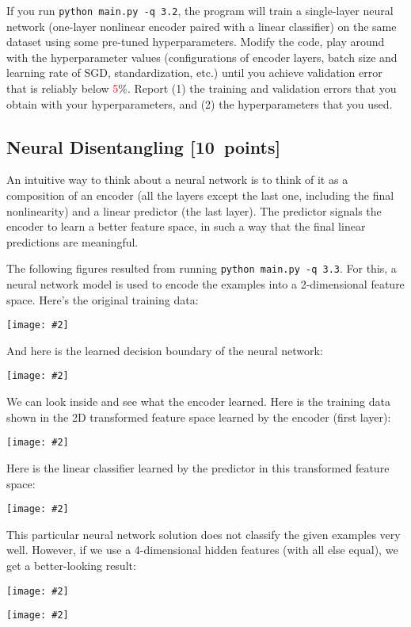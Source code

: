 \documentclass{article}
\newcommand{\blu}[1]{{\textcolor{blu}{#1}}}
\newcommand{\red}[1]{\textcolor{red}{#1}}
\let\ask\blu
\newcommand\pts[1]{\textcolor{pointscolour}{[#1~points]}}
\newcommand{\centerfig}[2]{\begin{center}\texttt{[image: \#2]}\end{center}}
\begin{document}
If you run \texttt{python main.py -q 3.2}, the program will train a single-layer neural network (one-layer nonlinear encoder paired with a linear classifier) on the same dataset using some pre-tuned hyperparameters. Modify the code, play around with the hyperparameter values (configurations of encoder layers, batch size and learning rate of SGD, standardization, etc.) until you achieve validation error that is reliably below \red{5}\%. \ask{Report (1) the training and validation errors that you obtain with your hyperparameters, and (2) the hyperparameters that you used.}




\subsection{Neural Disentangling \pts{10}}

An intuitive way to think about a neural network is to think of it as a composition of an encoder (all the layers except the last one, including the final nonlinearity) and a linear predictor (the last layer). The predictor signals the encoder to learn a better feature space, in such a way that the final linear predictions are meaningful.

The following figures resulted from running \texttt{python main.py -q 3.3}. For this, a neural network model is used to encode the examples into a 2-dimensional feature space. Here's the original training data:

\centerfig{.7}{./figs/sinusoids.png}

And here is the learned decision boundary of the neural network:

\centerfig{.7}{./figs/sinusoids_decision_boundary_[2]_2.png}

We can look inside and see what the encoder learned. Here is the training data shown in the 2D transformed feature space learned by the encoder (first layer):

\centerfig{.7}{./figs/sinusoids_learned_features_[2]_2.png}

Here is the linear classifier learned by the predictor in this transformed feature space:

\centerfig{.7}{./figs/sinusoids_linear_boundary_[2]_2.png}


This particular neural network solution does not classify the given examples very well. However, if we use a 4-dimensional hidden features (with all else equal), we get a better-looking result:

\centerfig{.7}{./figs/sinusoids_decision_boundary_[4]_2.png}
\centerfig{.7}{./figs/sinusoids_linear_boundary_[4]_2.png}
\end{document}
